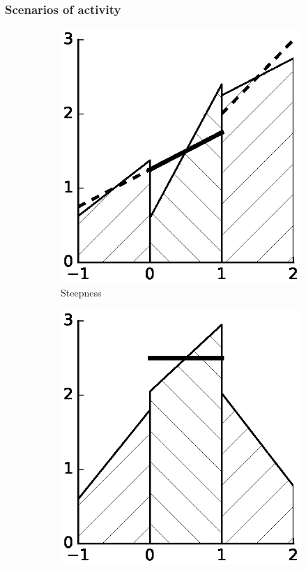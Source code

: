 \documentclass[11pt]{beamer}
\begin{document}
\begin{frame}
  \frametitle{Scenarios of activity}
  \begin{figure}[h]
    \centering
    \begin{subfigure}{0.3\textwidth}
      \centering
      \includegraphics[width=\textwidth]{figures/minmod/steepness}
      \caption{Steepness}
    \end{subfigure}
    \hfill
    \begin{subfigure}{0.3\textwidth}
      \centering
      \includegraphics[width=\textwidth]{figures/minmod/extremum}

\end{subfigure}
\end{figure}
\end{frame}
\end{document}
